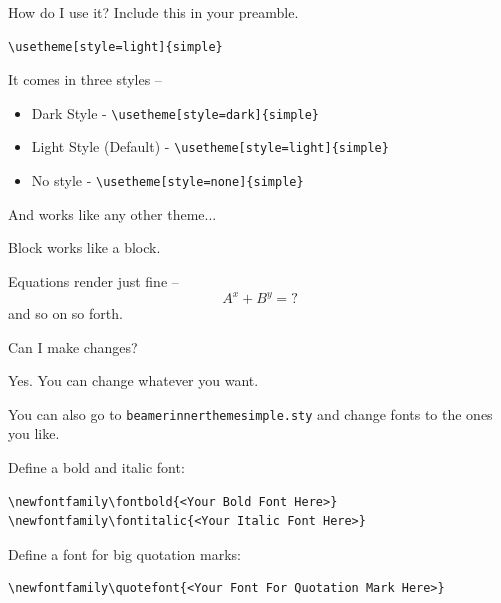 \documentclass[xetex, aspectratio=169,professionalfont]{beamer}
\begin{document}
\begin{frame}[fragile]{How do I use it?}
	Include this in your preamble.
\begin{verbatim}
\usetheme[style=light]{simple} 
\end{verbatim}

It comes in	three styles --
\begin{itemize}
	\item Dark Style - \verb|\usetheme[style=dark]{simple} |
	\item \alert{Light Style (Default)}  - \verb|\usetheme[style=light]{simple} |
	\item No style - \verb|\usetheme[style=none]{simple} |
\end{itemize}

And works like any other theme...

\begin{block}{Block}
works like a block.
\end{block}

Equations render just fine -- 
\begin{equation}
A^x + B^y = ?
\end{equation}
and so on so forth.
\end{frame}

\begin{frame}[fragile]{Can I make changes?}
\begin{center}
	\alert{Yes. You can change whatever you want.} 
\end{center}



You can also go to \verb|beamerinnerthemesimple.sty| and change fonts to the ones you like.

Define a bold and italic font:
\begin{verbatim}
\newfontfamily\fontbold{<Your Bold Font Here>}
\newfontfamily\fontitalic{<Your Italic Font Here>}
\end{verbatim}
Define a font for big quotation marks:
\begin{verbatim}
\newfontfamily\quotefont{<Your Font For Quotation Mark Here>}
\end{verbatim}
\end{frame} 

\begin{frame}
	\vspace{2\baselineskip}
\end{frame}
\end{document}

